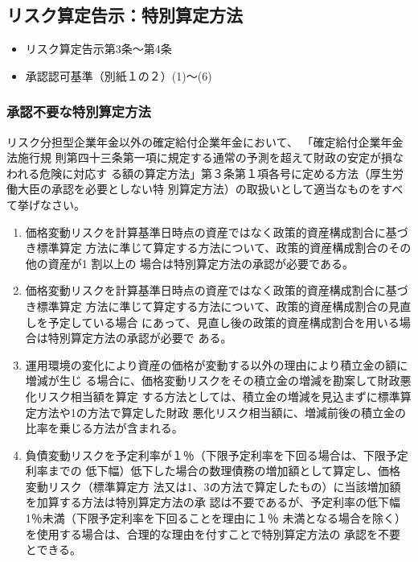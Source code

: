\newpage

\subsection{リスク算定告示：特別算定方法}


\begin{InyouJobunbox}
  \begin{itemize}
    \item リスク算定告示第3条〜第4条
    \item 承認認可基準（別紙１の２）(1)〜(6)
  \end{itemize}
\end{InyouJobunbox}

\subsubsection{承認不要な特別算定方法}

\begin{truefalse}[年金2 2022 問題1(1)A]
  リスク分担型企業年金以外の確定給付企業年金において、 「確定給付企業年金法施行規
則第四十三条第一項に規定する通常の予測を超えて財政の安定が損なわれる危険に対応す
る額の算定方法」第３条第１項各号に定める方法（厚生労働大臣の承認を必要としない特
別算定方法）の取扱いとして適当なものをすべて挙げなさい。

\begin{enumerate}[1. ]
  \item 価格変動リスクを計算基準日時点の資産ではなく政策的資産構成割合に基づき標準算定
方法に準じて算定する方法について、政策的資産構成割合のその他の資産が1 割以上の
場合は特別算定方法の承認が必要である。
  \item 価格変動リスクを計算基準日時点の資産ではなく政策的資産構成割合に基づき標準算定
方法に準じて算定する方法について、政策的資産構成割合の見直しを予定している場合
にあって、見直し後の政策的資産構成割合を用いる場合は特別算定方法の承認が必要で
ある。
  \item 運用環境の変化により資産の価格が変動する以外の理由により積立金の額に増減が生じ
る場合に、価格変動リスクをその積立金の増減を勘案して財政悪化リスク相当額を算定
する方法としては、積立金の増減を見込まずに標準算定方法や1の方法で算定した財政
悪化リスク相当額に、増減前後の積立金の比率を乗じる方法が含まれる。
  \item 負債変動リスクを予定利率が１％（下限予定利率を下回る場合は、下限予定利率までの
低下幅）低下した場合の数理債務の増加額として算定し、価格変動リスク（標準算定方
法又は1、3の方法で算定したもの）に当該増加額を加算する方法は特別算定方法の承
認は不要であるが、予定利率の低下幅1％未満（下限予定利率を下回ることを理由に１％
未満となる場合を除く）を使用する場合は、合理的な理由を付すことで特別算定方法の
承認を不要とできる。
\end{enumerate}
\end{truefalse}

